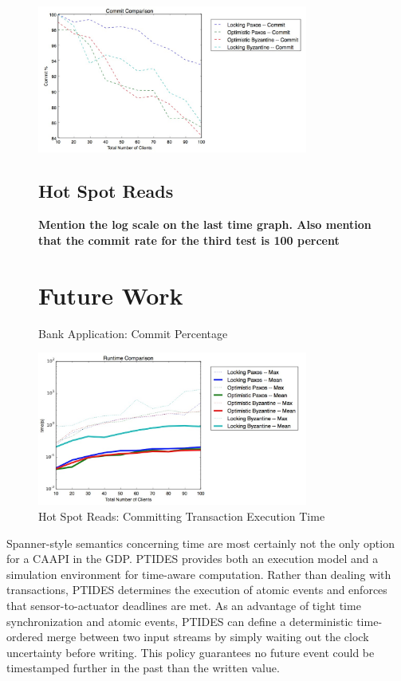 \documentclass[10pt,twocolumn]{article}
\begin{document}
\begin{figure}[!b]
  \begin{center}
    \includegraphics[width=3.5in]{Images/2-commit.png}
  \end{center}

\subsection{Hot Spot Reads}
\textbf{Mention the log scale on the last time graph. Also mention that the commit rate for the third test is 100 percent }

\section{Future Work}

  \caption{\small Bank Application: Commit Percentage }
  \label{2-commit}
\end{figure}

\begin{figure}[!b]
  \begin{center}
    \includegraphics[width=3.5in]{Images/3-time.png}
  \end{center}

  \caption{\small Hot Spot Reads: Committing Transaction Execution Time }
  \label{3-time}
\end{figure}





Spanner-style semantics concerning time are most certainly not the only option for a CAAPI in the GDP. PTIDES \cite{zou_execution_2009} provides both an execution model and a simulation environment for time-aware computation. Rather than dealing with transactions, PTIDES determines the execution of atomic events and enforces that sensor-to-actuator deadlines are met. As an advantage of tight time synchronization and atomic events, PTIDES can define a deterministic time-ordered merge between two input streams by simply waiting out the clock uncertainty before writing. This policy guarantees no future event could be timestamped further in the past than the written value.
\end{document}
